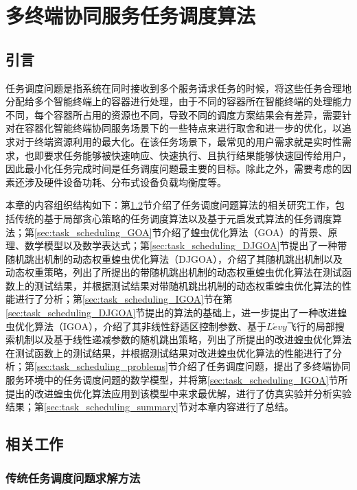 \chapter{多终端协同服务任务调度算法}\label{chap:task_scheduling}

\section{引言}

任务调度问题是指系统在同时接收到多个服务请求任务的时候，将这些任务合理地分配给多个智能终端上的容器进行处理，由于不同的容器所在智能终端的处理能力不同，每个容器所占用的资源也不同，导致不同的调度方案结果会有差异，需要针对在容器化智能终端协同服务场景下的一些特点来进行取舍和进一步的优化，以追求对于终端资源利用的最大化。在该任务场景下，最常见的用户需求就是实时性需求，也即要求任务能够被快速响应、快速执行、且执行结果能够快速回传给用户，因此最小化任务完成时间是任务调度问题最主要的目标。除此之外，需要考虑的因素还涉及硬件设备功耗、分布式设备负载均衡度等。

本章的内容组织结构如下：第\ref{sec:task_scheduling_related_work}节介绍了任务调度问题算法的相关研究工作，包括传统的基于局部贪心策略的任务调度算法以及基于元启发式算法的任务调度算法；第\ref{sec:task_scheduling_GOA}节介绍了蝗虫优化算法（GOA）的背景、原理、数学模型以及数学表达式；第\ref{sec:task_scheduling_DJGOA}节提出了一种带随机跳出机制的动态权重蝗虫优化算法（DJGOA），介绍了其随机跳出机制以及动态权重策略，列出了所提出的带随机跳出机制的动态权重蝗虫优化算法在测试函数上的测试结果，并根据测试结果对带随机跳出机制的动态权重蝗虫优化算法的性能进行了分析；第\ref{sec:task_scheduling_IGOA}节在第\ref{sec:task_scheduling_DJGOA}节提出的算法的基础上，进一步提出了一种改进蝗虫优化算法（IGOA），介绍了其非线性舒适区控制参数、基于$L\acute{e}vy$飞行的局部搜索机制以及基于线性递减参数的随机跳出策略，列出了所提出的改进蝗虫优化算法在测试函数上的测试结果，并根据测试结果对改进蝗虫优化算法的性能进行了分析；第\ref{sec:task_scheduling_problems}节介绍了任务调度问题，提出了多终端协同服务环境中的任务调度问题的数学模型，并将第\ref{sec:task_scheduling_IGOA}节所提出的改进蝗虫优化算法应用到该模型中来求最优解，进行了仿真实验并分析实验结果；第\ref{sec:task_scheduling_summary}节对本章内容进行了总结。

\section{相关工作}\label{sec:task_scheduling_related_work}

\subsection{传统任务调度问题求解方法}

